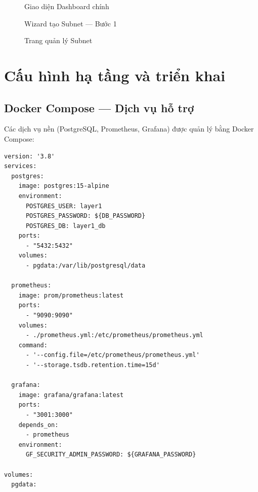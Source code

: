 \begin{figure}[H]
\centering
{}
\caption{Giao diện Dashboard chính}
\label{fig:dashboard}
\end{figure}

\begin{figure}[H]
\centering
{}
\caption{Wizard tạo Subnet --- Bước 1}
\label{fig:wizard_step1}
\end{figure}

\begin{figure}[H]
\centering
{}
\caption{Trang quản lý Subnet}
\label{fig:subnets_page}
\end{figure}


\section{Cấu hình hạ tầng và triển khai}

\subsection{Docker Compose --- Dịch vụ hỗ trợ}

Các dịch vụ nền (PostgreSQL, Prometheus, Grafana) được quản lý bằng Docker Compose:

\begin{lstlisting}[caption={docker-compose.yml --- Dịch vụ hạ tầng}, label={lst:docker_compose}, language={}]
version: '3.8'
services:
  postgres:
    image: postgres:15-alpine
    environment:
      POSTGRES_USER: layer1
      POSTGRES_PASSWORD: ${DB_PASSWORD}
      POSTGRES_DB: layer1_db
    ports:
      - "5432:5432"
    volumes:
      - pgdata:/var/lib/postgresql/data

  prometheus:
    image: prom/prometheus:latest
    ports:
      - "9090:9090"
    volumes:
      - ./prometheus.yml:/etc/prometheus/prometheus.yml
    command:
      - '--config.file=/etc/prometheus/prometheus.yml'
      - '--storage.tsdb.retention.time=15d'

  grafana:
    image: grafana/grafana:latest
    ports:
      - "3001:3000"
    depends_on:
      - prometheus
    environment:
      GF_SECURITY_ADMIN_PASSWORD: ${GRAFANA_PASSWORD}

volumes:
  pgdata:
\end{lstlisting}

